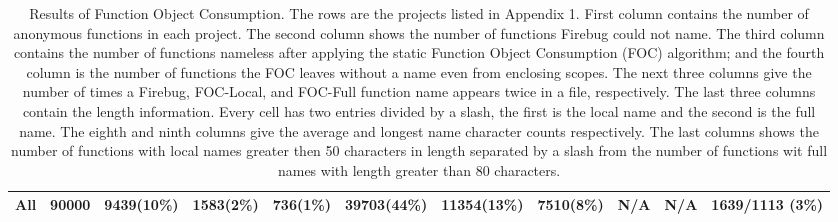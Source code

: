 \documentclass[10pt, preprint]{sigplanconf}
\begin{document}
\begin{table}[htp]
{\begin{tabular}{ | l | l | l | l | l | l | l | l | l | l | l |}
  \hline 
   All           & 90000     &   9439(10\%)   & 1583(2\%) & 736(1\%)  &    39703(44\%)      &    11354(13\%) & 7510(8\%)   & N/A       & N/A      & 1639/1113 (3\%)  \\ 
  \hline       
  \end{tabular}
  }
\caption{Results of Function Object Consumption. The rows are the projects listed in Appendix 1. First column contains the number of anonymous functions in each project. The second column shows the number of functions Firebug could not name. The third column contains the number of functions nameless after applying the static Function Object Consumption (FOC) algorithm; and the fourth column is the number of functions the FOC leaves without a name even from enclosing scopes. The next three columns give the number of times a Firebug, FOC-Local, and FOC-Full function name appears twice in a file, respectively. The last three columns contain the length information. Every cell has two entries divided by a slash, the first is the local name and the second is the full name. The eighth and ninth columns give the average and longest name character counts respectively. The last columns shows the number of functions with local names greater then 50 characters in length separated by a slash from the number of functions wit full names with length greater than 80 characters.} 
 \label{evaluation} 
\end{table}    



\end{document}
